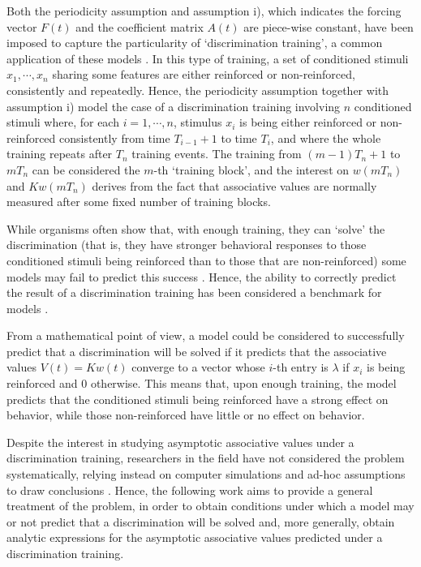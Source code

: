 \documentclass[]{interact}
\theoremstyle{plain}%
\theoremstyle{definition}
\theoremstyle{remark}
\newcommand{\quot}[1]{`#1'}
\begin{document}
Both the periodicity assumption and assumption i), which indicates the forcing vector $F(t)$ and the coefficient matrix $A(t)$ are piece-wise constant, have been imposed to capture the particularity of \quot{discrimination training}, a common application of these models \cite{P94,W03,WM97}. In this type of training, a set of conditioned stimuli $x_1,\cdots,x_n$ sharing some features are either reinforced or non-reinforced, consistently and repeatedly. Hence, the periodicity assumption together with assumption i) model the case of a discrimination training involving $n$ conditioned stimuli where, for each $i=1,\cdots, n$, stimulus $x_i$ is being either reinforced or non-reinforced consistently from time $T_{i-1}+1$ to time $T_i$, and where the whole training repeats after $T_n$ training events. The training from $(m-1)T_{n}+1$ to $mT_n$ can be considered the $m$-th \quot{training block}, and the interest on $w(mT_n)$ and $Kw(mT_n)$ derives from the fact that associative values are normally measured after some fixed number of training blocks. 

While organisms often show that, with enough training, they can \quot{solve} the discrimination (that is,  they have stronger behavioral responses to those conditioned stimuli being reinforced than to those that are non-reinforced) some models may fail to predict this success \cite{A24}. Hence, the ability to correctly predict the result of a discrimination training has been considered a benchmark for models \cite{WM97}. 

From a mathematical point of view, a model could be considered to successfully predict that a discrimination will be solved if it predicts that the associative values $V(t)=Kw(t)$ converge to a vector whose $i$-th entry is $\lambda$ if $x_i$ is being reinforced and $0$ otherwise. This means that, upon enough training, the model predicts that the conditioned stimuli being reinforced have a strong effect on behavior, while those non-reinforced have little or no effect on behavior. 

Despite the interest in studying asymptotic associative values under a discrimination training, researchers in the field have not considered the problem systematically, relying instead on computer simulations and ad-hoc assumptions to draw conclusions \cite[e.g.,][]{BVW00,P94,W03,A24}. Hence, the following work aims to provide a general treatment of the problem, in order to obtain conditions under which a model may or not predict that a discrimination will be solved and, more generally, obtain analytic expressions for the asymptotic associative values predicted under a discrimination training. 
\end{document}
